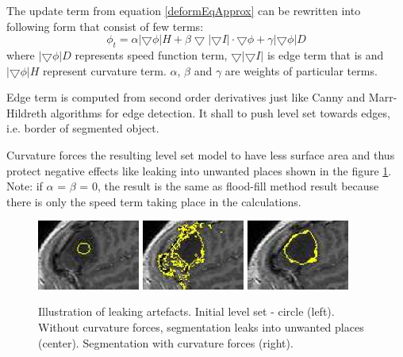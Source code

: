 The update term from equation \ref{deformEqApprox} can be rewritten into following form that consist of few terms:
\begin{equation}
\phi_t = \alpha |\bigtriangledown \phi| H + \beta
\bigtriangledown|\bigtriangledown I|\cdot \bigtriangledown \phi +
\gamma|\bigtriangledown \phi|D
\end{equation}
where $|\bigtriangledown \phi|D$ represents speed function term, $\bigtriangledown|\bigtriangledown I|$ is edge term that is and $|\bigtriangledown \phi| H$ represent curvature term. $\alpha$, $\beta$ and $\gamma$ are weights of particular terms.

Edge term is computed from second order derivatives just like Canny and Marr-Hildreth algorithms for edge detection.
It shall to push level set towards edges, i.e. border of segmented object.

Curvature forces the resulting level set model to have less surface area and thus protect negative effects like leaking into unwanted places shown in the figure \ref{fg:leaking}.
Note: if $\alpha$ = $\beta$ = 0, the result is the same as flood-fill method result because there is only the speed term taking place in the calculations.

\begin{figure}
    \centering
    \includegraphics[width=0.3\textwidth]{data/png/leaking1}
    \includegraphics[width=0.3\textwidth]{data/png/leaking2}
    \includegraphics[width=0.3\textwidth]{data/png/leaking3}
    \caption[Leaking]{Illustration of leaking artefacts.
    Initial level set - circle (left).
    Without curvature forces, segmentation leaks into unwanted places (center).
    Segmentation with curvature forces (right).
}
    \label{fg:leaking}
\end{figure}

